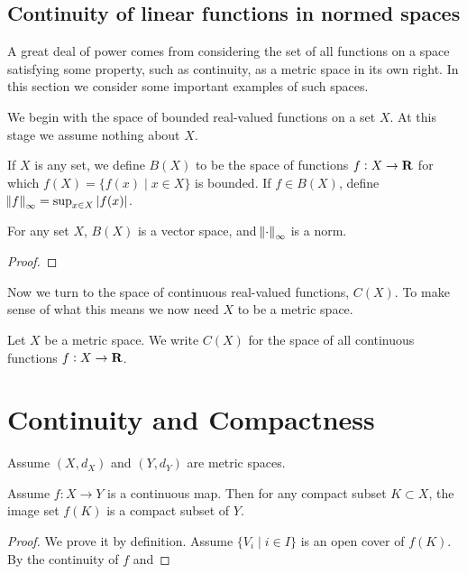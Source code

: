 \subsection{Continuity of linear functions in normed spaces}
A great deal of power comes from considering the set of all functions on a space satisfying some property, such as continuity, as a metric space in its own right. In this section we consider some important examples of such spaces.

We begin with the space of bounded real-valued functions on a set $X$. At this stage we assume nothing about $X$.

\begin{definition}
If $X$ is any set, we define $B(X)$ to be the space of functions $f:X\to\mathbf R$ for which $f(X)=\{f(x)\mid x\in X\}$ is bounded. If $f\in B(X)$, define $\norm{f}_\infty=\sup_{x\in X}|f(x)|$.
\end{definition}

\begin{lemma}
For any set $X$, $B(X)$ is a vector space, and $\norm{\cdot}_\infty$ is a norm.
\end{lemma}

\begin{proof}

\end{proof}

Now we turn to the space of continuous real-valued functions, $C(X)$. To make sense of what this means we now need $X$ to be a metric space.

\begin{definition}
Let $X$ be a metric space. We write $C(X)$ for the space of all continuous functions $f:X\to\mathbf R$.
\end{definition}



\section{Continuity and Compactness}
Assume $(X,d_X)$ and $(Y,d_Y)$ are metric spaces.

\begin{theorem}
Assume $f:X\to Y$ is a continuous map. Then for any compact subset $K\subset X$, the image set $f(K)$ is a compact subset of $Y$.
\end{theorem}

\begin{proof}
We prove it by definition. Assume $\{V_i\mid i\in I\}$ is an open cover of $f(K)$. By the continuity of $f$ and 
\end{proof}

